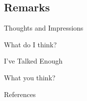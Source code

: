 \documentclass{beamer}
\begin{document}
\subsection{Remarks}

\begin{frame}{Thoughts and Impressions}

  \Large What do I think?

\end{frame}


\begin{frame}{I've Talked Enough}

  \Large What you think?

\end{frame}


\setbeamercovered{}
\beamerdefaultoverlayspecification{}

\begin{frame}[c,allowframebreaks]{References}

\small

\nocite{*}

\itemize

\end{frame}

\end{document}
